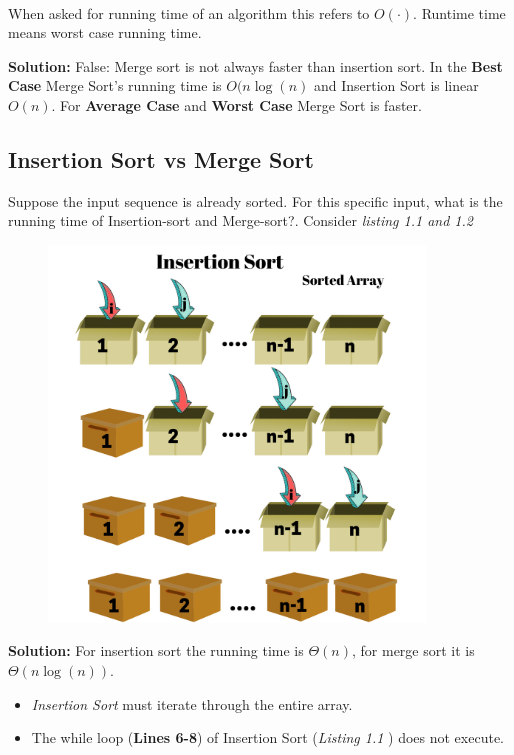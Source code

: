 \documentclass[11pt,fleqn]{book}
\begin{document}
\\
\begin{remark}
When asked for running time of an algorithm this refers to $O(\cdot)$. Runtime time means worst case running time. 
\end{remark}
\vspace{1em}
\textbf{Solution: } 
False: Merge sort is not always faster than insertion sort. In the \textbf{Best Case} Merge Sort's running time is $O(n\log(n)$ and Insertion Sort is linear $O(n)$. For \textbf{Average Case} and \textbf{Worst Case} Merge Sort is faster. 
\subsection{Insertion Sort vs Merge Sort}
\begin{example}
Suppose the input sequence is already sorted.  For this specific input, what is the running time of Insertion-sort and Merge-sort?. Consider \textit{listing 1.1 and 1.2}
\end{example}
\begin{figure}[H]
    \centering
    \includegraphics[width=100mm]{Pictures/SortedInsertion.pdf}
\end{figure}
\textbf{Solution:} For insertion sort the running time is $\Theta(n)$, for merge sort it is $\Theta(n\log(n))$.
\begin{itemize}
    \item \textit{Insertion Sort} must iterate through the entire array.
    \item The while loop (\textbf{Lines 6-8}) of Insertion Sort (\textit{Listing 1.1} ) does not execute.
\end{itemize}
\end{document}
